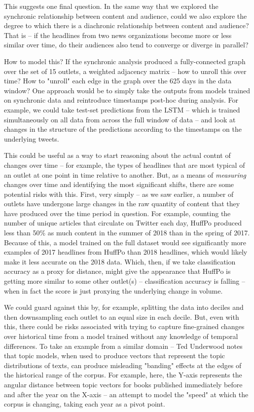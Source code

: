 \documentclass{scrartcl}
\begin{document}
This suggests one final question. In the same way that we explored the synchronic relationship between content and audience, could we also explore the degree to which there is a diachronic relationship between content and audience? That is -- if the headlines from two news organizations become more or less similar over time, do their audiences also tend to converge or diverge in parallel?

How to model this? If the synchronic analysis produced a fully-connected graph over the set of 15 outlets, a weighted adjacency matrix -- how to unroll this over time? How to "unroll" each edge in the graph over the 625 days in the data window? One approach would be to simply take the outputs from models trained on synchronic data and reintroduce timestamps post-hoc during analysis. For example, we could take test-set predictions from the LSTM -- which is trained simultaneously on all data from across the full window of data -- and look at changes in the structure of the predictions according to the timestamps on the underlying tweets.

This could be useful as a way to start reasoning about the actual contnt of changes over time -- for example, the types of headlines that are most typical of an outlet at one point in time relative to another. But, as a means of \textit{measuring} changes over time and identifying the most significant shifts, there are some potential risks with this. First, very simply -- as we saw earlier, a number of outlets have undergone large changes in the raw quantity of content that they have produced over the time period in question. For example, counting the number of unique articles that circulate on Twitter each day, HuffPo produced less than 50\% as much content in the summer of 2018 than in the spring of 2017. Because of this, a model trained on the full dataset would see significantly more examples of 2017 headlines from HuffPo than 2018 headlines, which would likely make it less accurate on the 2018 data. Which, then, if we take classification accuracy as a proxy for distance, might give the appearance that HuffPo is getting more similar to some other outlet(s) -- classification accuracy is falling -- when in fact the score is just proxying the underlying change in volume.

We could guard against this by, for example, splitting the data into deciles and then downsampling each outlet to an equal size in each decile. But, even with this, there could be risks associated with trying to capture fine-grained changes over historical time from a model trained without any knowledge of temporal differences. To take an example from a similar domain -- Ted Underwood notes that topic models, when used to produce vectors that represent the topic distributions of texts, can produce misleading "banding" effects at the edges of the historical range of the corpus. For example, here, the Y-axis represents the angular distance between topic vectors for books published immediately before and after the year on the X-axis -- an attempt to model the "speed" at which the corpus is changing, taking each year as a pivot point.
\end{document}
